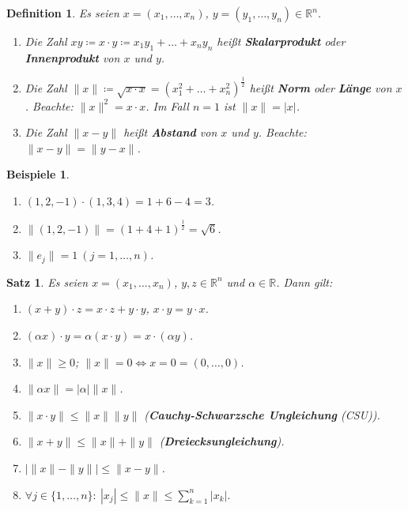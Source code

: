 \documentclass[12pt]{extreport} %
\newcommand{\R}{\mathbb{R}}
\theoremstyle{named}
\theoremstyle{itshape}
\newtheorem{satz}[unnamedtheorem]{Satz}
\newtheorem*{definition}{Definition}
\theoremstyle{normal}
\newtheorem*{beispiele}{Beispiele}
\begin{document}
{   
\begin{definition}
	Es seien $x = (x_{1}, \dotsc, x_{n})$, $y = (y_{1}, \dotsc, y_{n}) \in \R^{n}$.
	\begin{enumerate}
		\item Die Zahl $xy \coloneqq x \cdot y \coloneqq x_{1} y_{1} + \dotsc + x_{n} y_{n}$ hei{\ss}t \textbf{Skalarprodukt} oder \textbf{Innenprodukt} von $x$ und $y$. 
		\item Die Zahl $\| x \| \coloneqq \sqrt{x \cdot x} = (x_{1}^{2} + \dotsc + x_{n}^{2})^{\frac{1}{2}}$ hei{\ss}t \textbf{Norm} oder \textbf{Länge} von $x$. 
		Beachte: $\|x\|^{2} = x \cdot x$. Im Fall $n = 1$ ist $\|x\| = |x|$.
		\item Die Zahl $\| x - y \|$ hei{\ss}t \textbf{Abstand} von $x$ und $y$. Beachte: $\| x - y \| = \| y - x \|$.
	\end{enumerate}
\end{definition}


\begin{beispiele} ~\
	\begin{enumerate}
		\item $(1, 2, -1) \cdot (1, 3, 4) = 1 + 6 - 4 = 3$.
		\item $\| (1, 2, -1) \| = (1 + 4 + 1)^{\frac{1}{2}} = \sqrt{6}$.
		\item $\| e_{j} \| = 1 ~(j = 1, \dotsc, n)$.
	\end{enumerate}
\end{beispiele}

 
\begin{satz} \label{14.1:satz}
	Es seien $x = (x_{1}, \dotsc, x_{n})$, $y, z \in \R^{n}$ und $\alpha \in \R$. Dann gilt:
	\begin{enumerate}
		\item $(x + y) \cdot z = x \cdot z + y \cdot y$, $x \cdot y = y \cdot x$.
		\item $(\alpha x) \cdot y = \alpha (x \cdot y) = x \cdot (\alpha y)$.
		\item $\| x \| \geq 0$; $\| x \| = 0 \iff x = 0 = (0, \dotsc, 0)$.
		\item $\| \alpha x \| = |\alpha| \| x \|$.
		\item $\| x \cdot y \| \leq \| x \| \| y \|$ (\textbf{Cauchy-Schwarzsche Ungleichung} (CSU)).
		\item $\| x + y\| \leq \| x \| + \| y \|$ (\textbf{Dreiecksungleichung}).
		\item $\left| \|x\| - \| y \| \right| \leq \| x - y \|$.
		\item $\forall j \in \{ 1, \dotsc, n \}: ~ |x_{j}| \leq \| x \| \leq \sum_{k=1}^{n} |x_{k}|.$
	\end{enumerate}
\end{satz}

}
\end{document}

